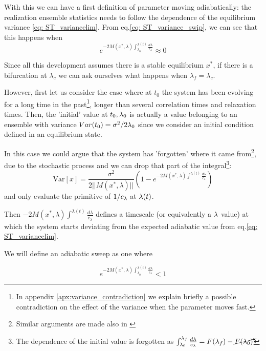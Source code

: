  With this we can have a first definition of parameter moving adiabatically: the realization ensemble statistics needs to follow the dependence of the equilibrium variance \cref{eq: ST_variancelim}. 
From eq.\eqref{eq: ST_variance_swip}, we can see that this happens when 
\begin{equation}
	e^{-2M(x^*,\lambda)	\int_{\lambda_0}^{\lambda(t)} \frac{d\lambda}{c_\lambda} }\approx 0
	\label{eq: ST_adabatic_condition}
\end{equation}

Since all this development assumes there is a stable equilibrium $x^*$, if there is a bifurcation at $\lambda_c$ we can ask ourselves what happens when $\lambda_f=\lambda_c$.


However, first let us consider the case where at $t_0$ the system has been evolving for a long time in the past\footnote{In appendix  \ref{apx:variance_contradiction} we explain briefly a possible contradiction on the effect of the variance when the parameter moves fast.}, longer than several correlation times and relaxation times. %
Then, the 'initial' value at $t_0, \lambda_0$ is actually a value belonging to an ensemble with variance $Var(t_0)=\sigma^2/2\lambda_0$ since we consider an initial condition defined in an equilibrium state. 

In this case we could argue that the system has 'forgotten' where it came from\footnote{Similar arguments are made also in \citep{...}}, due to the stochastic process and we can drop that part of the integral\footnote{The dependence of the initial value is forgotten as $\int^{\lambda_f}_{\lambda_0}\frac{d\lambda}{c_\lambda}=F(\lambda_f)-\cancelto{}{F(\lambda_0)}$}:
\begin{equation}
	\mathrm{Var}[x]=\frac{\sigma^2}{2 ||M(x^*,\lambda)||}(1-e^{-2M(x^*,\lambda)	\int^{\lambda(t)} \frac{d\lambda}{c_\lambda}})
	\label{eq: ST_variance_sweep2}
\end{equation}
and only evaluate the primitive of $1/c_\lambda$ at $\lambda(t)$.

Then $-2M(x^*,\lambda) \int^{\lambda(t)} \frac{d\lambda}{c_\lambda} $ defines a timescale (or equivalently a $\lambda$ value) at which the system starts deviating from the expected adiabatic value from eq.\eqref{eq: ST_variancelim}.


We will define an adiabatic sweep as one where

\begin{equation}
	e^{-2M(x^*,\lambda)	\int_{\lambda_0}^{\lambda(t)} \frac{d\lambda}{c_\lambda} }<1
\end{equation}

